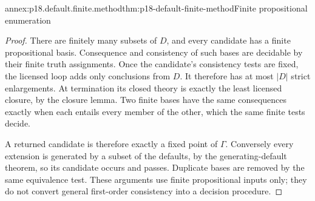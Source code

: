 \begin{annexitem}{annex:p18.default.finite.method}{thm:p18-default-finite-method}{Finite propositional enumeration}
\begin{proof}
There are finitely many subsets
of \(D\), and every candidate
has a finite propositional basis.
Consequence and consistency of
such bases are decidable by
their finite truth assignments.
Once the candidate's consistency
tests are fixed, the licensed
loop adds only conclusions
from \(D\). It therefore
has at most \(|D|\) strict
enlargements. At termination
its closed theory is exactly
the least licensed closure,
by the closure lemma.
Two finite bases have the
same consequences exactly
when each entails every
member of the other, which
the same finite tests decide.

A returned candidate is
therefore exactly a fixed
point of \(\Gamma\).
Conversely every extension
is generated by a subset
of the defaults, by the
generating-default theorem,
so its candidate occurs
and passes. Duplicate
bases are removed by the
same equivalence test.
These arguments use finite
propositional inputs only;
they do not convert general
first-order consistency into
a decision procedure.
\end{proof}
\end{annexitem}

